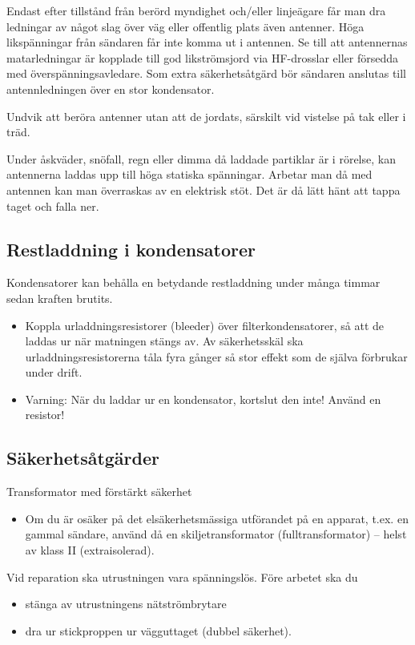 Endast efter tillstånd från berörd myndighet och/eller linjeägare får
man dra ledningar av något slag över väg eller offentlig plats även antenner.
Höga likspänningar från sändaren får inte komma ut i antennen.
Se till att antennernas matarledningar är kopplade till god likströmsjord
via HF-drosslar eller försedda med överspänningsavledare.
Som extra säkerhetsåtgärd bör sändaren anslutas till antennledningen över en
stor kondensator.

Undvik att beröra antenner utan att de jordats, särskilt vid vistelse
på tak eller i träd.

Under åskväder, snöfall, regn eller dimma då laddade partiklar är i
rörelse, kan antennerna laddas upp till höga statiska spänningar.
Arbetar man då med antennen kan man överraskas av en elektrisk stöt.
Det är då lätt hänt att tappa taget och falla ner.

\subsection{Restladdning i kondensatorer}

Kondensatorer kan behålla en betydande restladdning under många timmar
sedan kraften brutits.
\begin{itemize}
\item Koppla urladdningsresistorer (bleeder) över filterkondensatorer,
  så att de laddas ur när matningen stängs av.
  Av säkerhetsskäl ska urladdningsresistorerna tåla fyra gånger så stor effekt
  som de själva förbrukar under drift.
\item Varning: När du laddar ur en kondensator, kortslut den inte!
  Använd en resistor!
\end{itemize}

\subsection{Säkerhetsåtgärder}

Transformator med förstärkt säkerhet
\begin{itemize}
\item Om du är osäker på det elsäkerhetsmässiga utförandet på en
  apparat, t.ex. en gammal sändare, använd då en skiljetransformator
  (fulltransformator) -- helst av klass II (extraisolerad).
\end{itemize}

Vid reparation ska utrustningen vara spänningslös.
Före arbetet ska du
\begin{itemize}
  \item stänga av utrustningens nätströmbrytare
  \item dra ur stickproppen ur vägguttaget (dubbel säkerhet).
\end{itemize}

